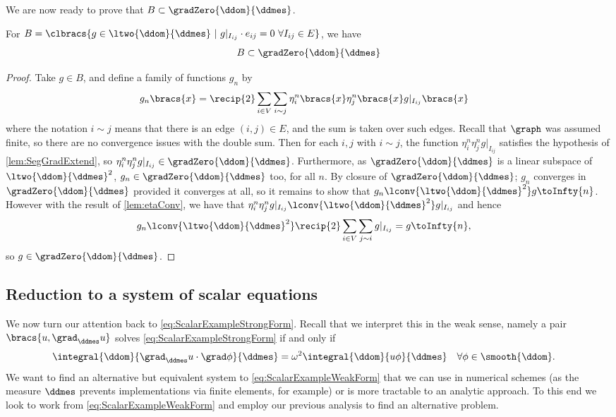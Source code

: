 We are now ready to prove that $B\subset\gradZero{\ddom}{\ddmes}$.
\begin{prop} \label{prop:BIncGrad0}
	For $B=\clbracs{g\in\ltwo{\ddom}{\ddmes} \ \vert \ g\vert_{I_{ij}}\cdot e_{ij}=0 \ \forall I_{ij}\in E}$, we have
	\begin{align*}
		B \subset \gradZero{\ddom}{\ddmes}
	\end{align*}
\end{prop}
\begin{proof}
	Take $g\in B$, and define a family of functions $g_{n}$ by
	\begin{align*}
		g_{n}\bracs{x} &= \recip{2}\sum_{i\in V}\sum_{i\sim j}\eta_{i}^{n}\bracs{x}\eta_{j}^{n}\bracs{x}g\vert_{I_{ij}}\bracs{x}
	\end{align*}
	where the notation $i\sim j$ means that there is an edge $(i,j)\in E$, and the sum is taken over such edges.
	Recall that $\graph$ was assumed finite, so there are no convergence issues with the double sum.
	Then for each $i,j$ with $i\sim j$, the function $\eta_{i}^{n}\eta_{j}^{n}g\vert_{I_{ij}}$ satisfies the hypothesis of \ref{lem:SegGradExtend}, so $\eta_{i}^{n}\eta_{j}^{n}g\vert_{I_{ij}}\in\gradZero{\ddom}{\ddmes}$.
	Furthermore, as $\gradZero{\ddom}{\ddmes}$ is a linear subspace of $\ltwo{\ddom}{\ddmes}^{2}$, $g_{n}\in\gradZero{\ddom}{\ddmes}$ too, for all $n$.
	By closure of $\gradZero{\ddom}{\ddmes}$; $g_{n}$ converges in $\gradZero{\ddom}{\ddmes}$ provided it converges at all, so it remains to show that $g_{n}\lconv{\ltwo{\ddom}{\ddmes}^2} g \toInfty{n}$.
	However with the result of \ref{lem:etaConv}, we have that $\eta_{i}^{n}\eta_{j}^{n}g\vert_{I_{ij}}\lconv{\ltwo{\ddom}{\ddmes}^2} g\vert_{I_{ij}}$ and hence
	\begin{align*}
		g_{n} \lconv{\ltwo{\ddom}{\ddmes}^2} &\recip{2}\sum_{i\in V}\sum_{j\sim i}g\vert_{I_{ij}} = g \toInfty{n},
	\end{align*}
	so $g\in\gradZero{\ddom}{\ddmes}$.
\end{proof}

\subsection{Reduction to a system of scalar equations}
We now turn our attention back to \eqref{eq:ScalarExampleStrongForm}.
Recall that we interpret this in the weak sense, namely a pair $\bracs{u,\grad_\ddmes u}$ solves \eqref{eq:ScalarExampleStrongForm} if and only if
\begin{align} \label{eq:ScalarExampleWeakForm}
	\integral{\ddom}{\grad_\ddmes u \cdot \grad\phi}{\ddmes} &= \omega^2\integral{\ddom}{u\phi}{\ddmes} \quad \forall\phi\in\smooth{\ddom}.
\end{align}
We want to find an alternative but equivalent system to \eqref{eq:ScalarExampleWeakForm} that we can use in numerical schemes (as the measure $\ddmes$ prevents implementations via finite elements, for example) or is more tractable to an analytic approach.
To this end we look to work from \eqref{eq:ScalarExampleWeakForm} and employ our previous analysis to find an alternative problem. \newline

